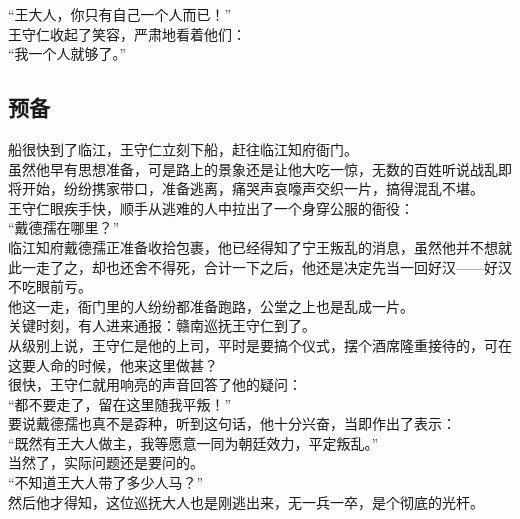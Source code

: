 \begin{multicols}{\theparacolNo}
“王大人，你只有自己一个人而已！”\\

王守仁收起了笑容，严肃地看着他们：\\

“我一个人就够了。”\\

\subsection{预备}
船很快到了临江，王守仁立刻下船，赶往临江知府衙门。\\

虽然他早有思想准备，可是路上的景象还是让他大吃一惊，无数的百姓听说战乱即将开始，纷纷携家带口，准备逃离，痛哭声哀嚎声交织一片，搞得混乱不堪。\\

王守仁眼疾手快，顺手从逃难的人中拉出了一个身穿公服的衙役：\\

“戴德孺在哪里？”\\

临江知府戴德孺正准备收拾包裹，他已经得知了宁王叛乱的消息，虽然他并不想就此一走了之，却也还舍不得死，合计一下之后，他还是决定先当一回好汉——好汉不吃眼前亏。\\

他这一走，衙门里的人纷纷都准备跑路，公堂之上也是乱成一片。\\

关键时刻，有人进来通报：赣南巡抚王守仁到了。\\

从级别上说，王守仁是他的上司，平时是要搞个仪式，摆个酒席隆重接待的，可在这要人命的时候，他来这里做甚？\\

很快，王守仁就用响亮的声音回答了他的疑问：\\

“都不要走了，留在这里随我平叛！”\\

要说戴德孺也真不是孬种，听到这句话，他十分兴奋，当即作出了表示：\\

“既然有王大人做主，我等愿意一同为朝廷效力，平定叛乱。”\\

当然了，实际问题还是要问的。\\

“不知道王大人带了多少人马？”\\

然后他才得知，这位巡抚大人也是刚逃出来，无一兵一卒，是个彻底的光杆。\\


\end{multicols}
